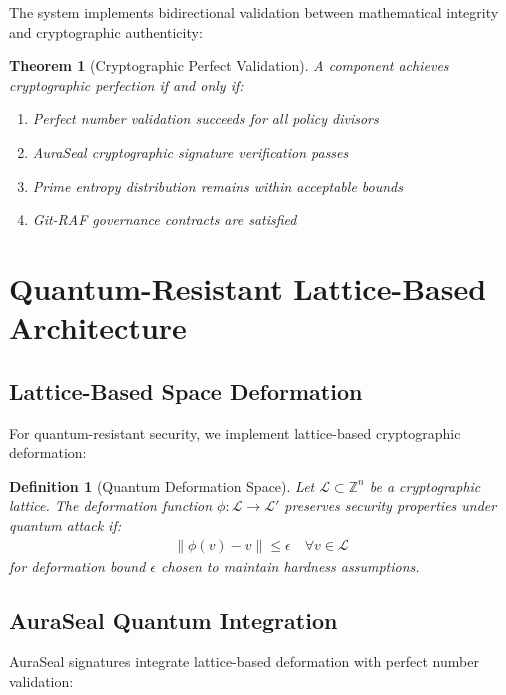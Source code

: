 \documentclass[a4paper,12pt]{article}
\newtheorem{definition}{Definition}
\newtheorem{theorem}{Theorem}
\begin{document}
The system implements bidirectional validation between mathematical integrity and cryptographic authenticity:

\begin{theorem}[Cryptographic Perfect Validation]
A component achieves cryptographic perfection if and only if:
\begin{enumerate}
\item Perfect number validation succeeds for all policy divisors
\item AuraSeal cryptographic signature verification passes
\item Prime entropy distribution remains within acceptable bounds
\item Git-RAF governance contracts are satisfied
\end{enumerate}
\end{theorem}

\section{Quantum-Resistant Lattice-Based Architecture}

\subsection{Lattice-Based Space Deformation}

For quantum-resistant security, we implement lattice-based cryptographic deformation:

\begin{definition}[Quantum Deformation Space]
Let $\mathcal{L} \subset \mathbb{Z}^n$ be a cryptographic lattice. The deformation function $\phi: \mathcal{L} \to \mathcal{L}'$ preserves security properties under quantum attack if:
\begin{align}
\|\phi(v) - v\| \leq \epsilon \quad \forall v \in \mathcal{L}
\end{align}
for deformation bound $\epsilon$ chosen to maintain hardness assumptions.
\end{definition}

\subsection{AuraSeal Quantum Integration}

AuraSeal signatures integrate lattice-based deformation with perfect number validation:
\end{document}
